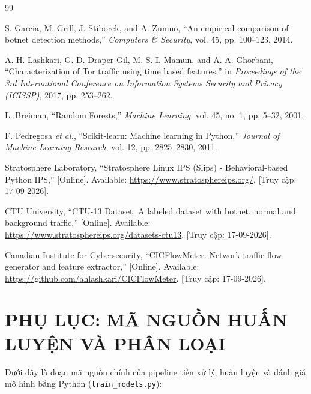 \documentclass[12pt,a4paper,oneside]{report}
\begin{document}
\newpage
\begin{thebibliography}{99}

S. Garcia, M. Grill, J. Stiborek, and A. Zunino, ``An empirical comparison of botnet detection methods,'' \textit{Computers \& Security}, vol. 45, pp. 100--123, 2014.

A. H. Lashkari, G. D. Draper-Gil, M. S. I. Mamun, and A. A. Ghorbani, ``Characterization of Tor traffic using time based features,'' in \textit{Proceedings of the 3rd International Conference on Information Systems Security and Privacy (ICISSP)}, 2017, pp. 253--262.

L. Breiman, ``Random Forests,'' \textit{Machine Learning}, vol. 45, no. 1, pp. 5--32, 2001.

F. Pedregosa \textit{et al.}, ``Scikit-learn: Machine learning in Python,'' \textit{Journal of Machine Learning Research}, vol. 12, pp. 2825--2830, 2011.

Stratosphere Laboratory, ``Stratosphere Linux IPS (Slips) - Behavioral-based Python IPS,'' [Online]. Available: \url{https://www.stratosphereips.org/}. [Truy cập: 17-09-2026].

CTU University, ``CTU-13 Dataset: A labeled dataset with botnet, normal and background traffic,'' [Online]. Available: \url{https://www.stratosphereips.org/datasets-ctu13}. [Truy cập: 17-09-2026].

Canadian Institute for Cybersecurity, ``CICFlowMeter: Network traffic flow generator and feature extractor,'' [Online]. Available: \url{https://github.com/ahlashkari/CICFlowMeter}. [Truy cập: 17-09-2026].

\end{thebibliography}

\newpage
\chapter*{PHỤ LỤC: MÃ NGUỒN HUẤN LUYỆN VÀ PHÂN LOẠI}

Dưới đây là đoạn mã nguồn chính của pipeline tiền xử lý, huấn luyện và đánh giá mô hình bằng Python (\texttt{train\_models.py}):
\end{document}
